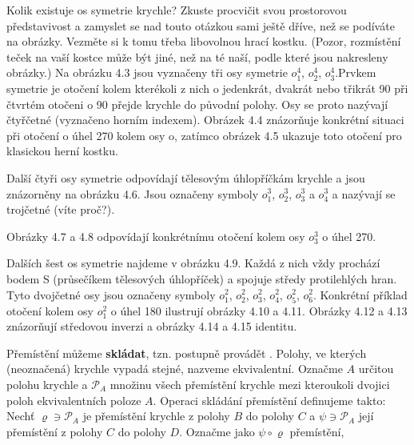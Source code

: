 \begin{example}
    Kolik existuje os symetrie krychle? Zkuste procvičit svou prostorovou představivost a zamyslet 
    se nad touto  otázkou sami ještě dříve, než se podíváte na obrázky. Vezměte si k tomu třeba 
    libovolnou hrací kostku. (Pozor, rozmístění teček na vaší kostce může být jiné, než na té naší, 
    podle které jsou nakresleny obrázky.) Na obrázku 4.3 jsou vyznačeny tři osy symetrie \(o_1^4\), 
    \(o_2^4\), \(o_3^4\).Prvkem symetrie je otočení kolem kterékoli z nich o jedenkrát, dvakrát 
    nebo třikrát \SI{90}{\deg} při čtvrtém otočeni o \SI{90}{\deg} přejde krychle do původní 
    polohy. Osy se proto nazývají čtyřčetné (vyznačeno horním indexem). Obrázek 4.4 znázorňuje 
    konkrétní situaci při otočení o úhel \SI{270}{\deg} kolem osy o, zatímco obrázek 4.5 ukazuje 
    toto otočení pro klasickou herní kostku.
    
    Další čtyři osy symetrie odpovídají tělesovým úhlopříčkám krychle a jsou znázorněny na obrázku 
    4.6. Jsou označeny symboly \(o_1^3\), \(o_2^3\), \(o_3^3\) a \(o_4^3\) a nazývají se trojčetné 
    (víte proč?).
    
    Obrázky 4.7 a 4.8 odpovídají konkrétnímu otočení kolem osy \(o_3^3\) o úhel \SI{270}{\deg}.
    
    Dalších šest os symetrie najdeme v obrázku 4.9. Každá z nich vždy prochází bodem S (průsečíkem 
    tělesových úhlopříček) a spojuje středy protilehlých hran. Tyto dvojčetné osy jsou označeny 
    symboly \(o_1^2\), \(o_2^2\), \(o_3^2\), \(o_4^2\), \(o_5^2\), \(o_6^2\). Konkrétní příklad 
    otočení kolem osy \(o_1^2\) o úhel \SI{180}{\deg} ilustrují obrázky 4.10 a 4.11. Obrázky 4.12 a 
    4.13 znázorňují středovou inverzi a obrázky 4.14 a 4.15 identitu.
    
    Přemístění můžeme \textbf{skládat}, tzn. postupně provádět . Polohy, ve kterých (neoznačená) 
    krychle vypadá stejné, nazveme ekvivalentní. Označme \(A\) určitou polohu krychle a 
    \(\mathcal{P}_A\) množinu všech přemístění krychle mezi kteroukoli dvojici poloh ekvivalentních 
    poloze \(A\). Operaci skládání přemístění definujeme takto: Nechť \(\varrho\ni\mathcal{P}_A\) 
    je přemístění krychle z polohy \(B\) do polohy \(C\) a \(\psi\ni\mathcal{P}_A\) její přemístění 
    z polohy \(C\) do polohy \(D\). Označme jako \(\psi\circ\varrho\) přemístění,
  \normalsize
\end{example}